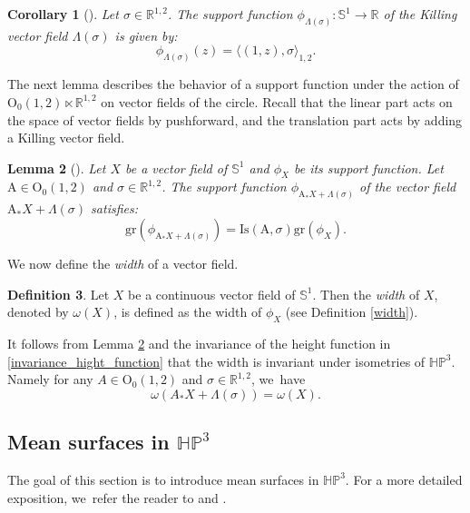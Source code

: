 \documentclass[11pt]{article}
\theoremstyle{plain}
\newtheorem{cor}{Corollary}[section]
\newtheorem{lemma}[cor]{Lemma}
\theoremstyle{definition}
\newtheorem{defi}[cor]{Definition}
\newcommand{\minko}{\mathbb{R}^{1,2}}
\newcommand{\HP}{\mathbb{HP}^3}
\newcommand{\inner}[1] {\langle #1 \rangle}
\begin{document}
\begin{cor}[{\cite[Cor.\,2.10]{diaf2023Infearth}}]\label{support_function_of_killing}
Let $\sigma\in \mathbb{R}^{1,2}$. The support function $\phi_{\Lambda(\sigma)}:\mathbb{S}^1\to \mathbb{R}$ of the Killing vector field $\Lambda(\sigma)$ is given by:
\[
\phi_{\Lambda(\sigma)}(z)=\inner{(1,z),\sigma}_{1,2}.
\]
\end{cor}
The next lemma describes the behavior of a support function under the action of $\mathrm{O}_0(1,2)\ltimes\minko$ on vector fields of the circle. Recall that the linear part acts on the space of vector fields by pushforward, and the translation part acts by adding a Killing vector field.

\begin{lemma}[{\cite[Lem.\,2.12]{diaf2023Infearth}}]\label{equii}
Let $X$ be a vector field of $\mathbb{S}^1$ and $\phi_X$ be its support function. Let $\mathrm{A}\in\mathrm{O}_0(1,2)$ and $\sigma\in\minko$. The support function $\phi_{\mathrm{A}_*X+\Lambda(\sigma)}$ of the vector field $\mathrm{A}_*X+\Lambda(\sigma)$ satisfies:\begin{equation}
\mathrm{gr}(\phi_{\mathrm{A}_*X+\Lambda(\sigma)})=\mathrm{Is}(\mathrm{A},\sigma)\mathrm{gr}(\phi_X).
\end{equation}

\end{lemma}
We now define the \emph{width} of a vector field.

\begin{defi}\label{widthX}
Let $X$ be a continuous vector field of $\mathbb{S}^1$. Then the \emph{width} of $X$, denoted by $\omega(X)$, is defined as the width of $\phi_X$ (see Definition \ref{width}).
\end{defi}
It follows from Lemma \ref{equii} and the invariance of the height function in \eqref{invariance_hight_function} that the width is invariant under isometries of $\HP$. Namely for any $A\in \mathrm{O}_{0}(1,2)$ and $\sigma\in\minko$, we~have
\[
\omega(A_*X+\Lambda(\sigma))=\omega(X).
\]

\subsection{Mean surfaces in \texorpdfstring{$\HP$}{HP}}
The goal of this section is to introduce mean surfaces in $\HP$. For a more detailed exposition, we~refer the reader to \cite[\S 5.2-6.3]{fillastreseppi} and \cite[\S 2.3.2]{barbotfillastre}.
\end{document}

